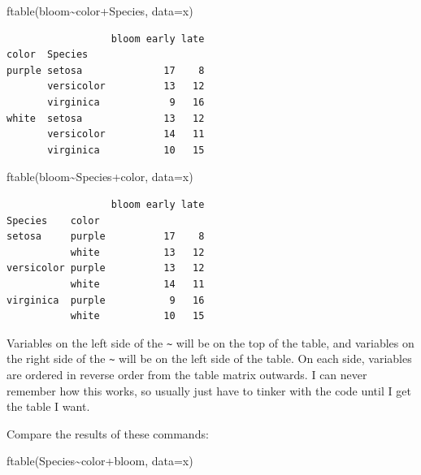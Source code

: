 \documentclass[
  13,
  letterpaper,
]{report}
\newenvironment{Shaded}{\begin{snugshade}}{\end{snugshade}}
\newcommand{\AttributeTok}[1]{\textcolor[rgb]{0.40,0.45,0.13}{#1}}
\newcommand{\FunctionTok}[1]{\textcolor[rgb]{0.28,0.35,0.67}{#1}}
\newcommand{\NormalTok}[1]{\textcolor[rgb]{0.00,0.23,0.31}{#1}}
\newcommand{\SpecialCharTok}[1]{\textcolor[rgb]{0.37,0.37,0.37}{#1}}
\begin{document}
\begin{Shaded}
\begin{Highlighting}[]
\FunctionTok{ftable}\NormalTok{(bloom}\SpecialCharTok{\textasciitilde{}}\NormalTok{color}\SpecialCharTok{+}\NormalTok{Species, }\AttributeTok{data=}\NormalTok{x)}
\end{Highlighting}
\end{Shaded}

\begin{verbatim}
                  bloom early late
color  Species                    
purple setosa              17    8
       versicolor          13   12
       virginica            9   16
white  setosa              13   12
       versicolor          14   11
       virginica           10   15
\end{verbatim}

\begin{Shaded}
\begin{Highlighting}[]
\FunctionTok{ftable}\NormalTok{(bloom}\SpecialCharTok{\textasciitilde{}}\NormalTok{Species}\SpecialCharTok{+}\NormalTok{color, }\AttributeTok{data=}\NormalTok{x)}
\end{Highlighting}
\end{Shaded}

\begin{verbatim}
                  bloom early late
Species    color                  
setosa     purple          17    8
           white           13   12
versicolor purple          13   12
           white           14   11
virginica  purple           9   16
           white           10   15
\end{verbatim}

Variables on the left side of the \texttt{\textasciitilde{}} will be on
the top of the table, and variables on the right side of the
\texttt{\textasciitilde{}} will be on the left side of the table. On
each side, variables are ordered in reverse order from the table matrix
outwards. I can never remember how this works, so usually just have to
tinker with the code until I get the table I want.

Compare the results of these commands:

\begin{Shaded}
\begin{Highlighting}[]
\FunctionTok{ftable}\NormalTok{(Species}\SpecialCharTok{\textasciitilde{}}\NormalTok{color}\SpecialCharTok{+}\NormalTok{bloom, }\AttributeTok{data=}\NormalTok{x)}
\end{Highlighting}
\end{Shaded}
\end{document}
